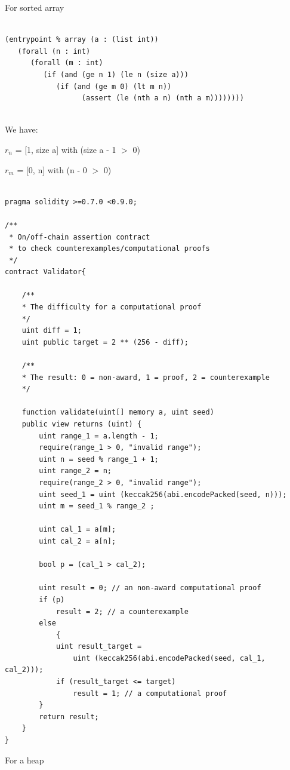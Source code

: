 \documentclass[runningheads]{llncs}
\begin{document}
For sorted array

\begin{lstlisting}[numbers=none]

(entrypoint % array (a : (list int))
   (forall (n : int)
      (forall (m : int)
         (if (and (ge n 1) (le n (size a)))
            (if (and (ge m 0) (lt m n))
                  (assert (le (nth a n) (nth a m))))))))
                  
\end{lstlisting}

\noindent We have:

$r_{n}$ = [1, size a] with (size a - 1 $>$ 0)

$r_{m}$ = [0, n] with (n - 0 $>$ 0)

\begin{lstlisting}[numbers=none]

pragma solidity >=0.7.0 <0.9.0;

/**
 * On/off-chain assertion contract 
 * to check counterexamples/computational proofs
 */
contract Validator{

    /**
    * The difficulty for a computational proof
    */
    uint diff = 1;
    uint public target = 2 ** (256 - diff); 

    /**
    * The result: 0 = non-award, 1 = proof, 2 = counterexample
    */

    function validate(uint[] memory a, uint seed)
    public view returns (uint) {
        uint range_1 = a.length - 1; 
        require(range_1 > 0, "invalid range");
        uint n = seed % range_1 + 1;
        uint range_2 = n;
        require(range_2 > 0, "invalid range");
        uint seed_1 = uint (keccak256(abi.encodePacked(seed, n)));
        uint m = seed_1 % range_2 ;
        
        uint cal_1 = a[m];
        uint cal_2 = a[n];
        
        bool p = (cal_1 > cal_2);

        uint result = 0; // an non-award computational proof 
        if (p)  
            result = 2; // a counterexample
        else 
            {
            uint result_target = 
                uint (keccak256(abi.encodePacked(seed, cal_1, cal_2)));
            if (result_target <= target) 
                result = 1; // a computational proof      
        }             
        return result;           
    }
}

\end{lstlisting}

For a heap
\end{document}

